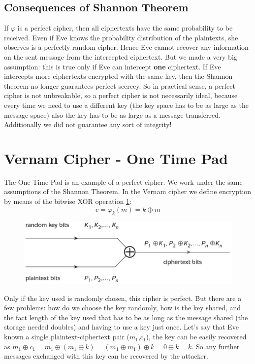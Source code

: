	\subsection{Consequences of Shannon Theorem}
	
	If $\varphi$ is a perfect cipher, then all ciphertexts have the same probability to be received. Even if Eve knows the probability distribution of the plaintexts, she observes is a perfectly random cipher. Hence Eve cannot recover any information on the sent message from the intercepted ciphertext. But we made a very big assumption: this is true only if Eve can intercept \textbf{one} ciphertext. If Eve intercepts more ciphertexts encrypted with the same key, then the Shannon theorem no longer guarantees perfect secrecy. So in practical sense, a perfect cipher is not unbreakable, so a perfect cipher is not necessarily ideal, because every time we need to use a different key (the key space has to be as large as the message space) also the key has to be as large as a message transferred. Additionally we did not guarantee any sort of integrity! 

\section{Vernam Cipher - One Time Pad}

The One Time Pad is an example of a perfect cipher. We work under the same assumptions of the Shannon Theorem. In the Vernam cipher we define encryption by means of the bitwise XOR operation \ref{fig:vernam_cipher}:
$$c = \varphi_k (m) = k \oplus m$$

\begin{figure}
	\centering
	\includegraphics[width=0.7\linewidth]{Images/Chapter1/vernam_cipher}
	\caption{}
	\label{fig:vernam_cipher}
\end{figure}

Only if the key used is randomly chosen, this cipher is perfect.
But there are a few problems: how do we choose the key randomly, how is the key shared, and the fact length of the key used that has to be as long as the message shared (the storage needed doubles) and having to use a key just once. Let's say that Eve known a single plaintext-ciphertext pair ($m_1$,$c_1$), the key can be easily recovered as $m_1 \oplus c_1=m_1 \oplus (m_1 \oplus k)=(m_1 \oplus m_1) \oplus k= 0 \oplus k = k$. So any further messages exchanged with this key can be recovered by the attacker.

